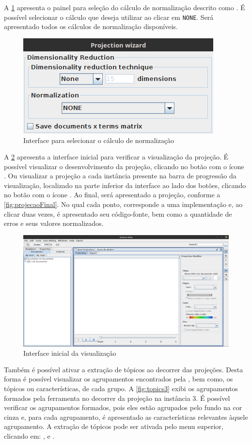 		A \cref{fig:normalizacao} apresenta o painel para seleção do cálculo de normalização
		descrito como . É possível selecionar o cálculo que deseja
		utilizar ao clicar em \texttt{NONE}. Será apresentado todos os cálculos de
		normalização disponíveis.
		
		\begin{figure}
			\centering
			\includegraphics[width=0.5\linewidth]{imagem/normalizacao}
			\caption{Interface para selecionar o cálculo de normalização}
			\label{fig:normalizacao}
		\end{figure}
		
		A \cref{fig:projecao} apresenta a interface inicial para verificar a visualização da
		projeção. É possível visualizar o desenvolvimento da projeção, clicando no botão
		com o ícone . Ou visualizar a projeção a cada instância presente na
		barra de progressão da visualização, localizado na parte inferior da interface ao
		lado dos botões, clicando no botão com o ícone . Ao final, será
		apresentado a projeção, conforme a \cref{fig:projecaoFinal}. No qual cada ponto,
		corresponde a uma implementação e, ao clicar duas vezes, é apresentado seu
		código-fonte, bem como a quantidade de erros e seus valores normalizados.
		
		\begin{figure}
			\centering
			\includegraphics[width=0.8\linewidth]{imagem/projecao}
			\caption{Interface inicial da visualização}
			\label{fig:projecao}
		\end{figure}
		
		Também é possível ativar a extração de tópicos ao decorrer das projeções. Desta
		forma é possível visualizar os agrupamentos encontrados pela ,
		bem como, os tópicos ou características, de cada grupo. A \cref{fig:topics3}
		exibi os agrupamentos formados pela ferramenta no decorrer da projeção na instância
		$3$. É possível verificar os agrupamentos formados, pois eles estão agrupados
		pelo fundo na cor cinza e, para cada agrupamento, é apresentado as características
		relevantes àquele agrupamento. A extração de tópicos pode ser ativada pelo menu
		superior, clicando em: , 
		e .
		
